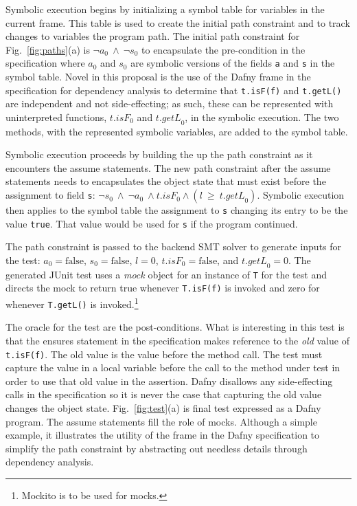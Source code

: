 \documentclass[11pt,onecolumn,notitlepage]{article}
\newcommand{\figref}[1]{Fig.~\ref{#1}}
\begin{document}
Symbolic execution begins by initializing a symbol table for variables in the current frame. This table is used to create the initial path constraint and to track changes to variables the program path. The initial path constraint for \figref{fig:paths}(a) is $\neg a_0\ \wedge\ \neg s_0$ to encapsulate the pre-condition in the specification where $a_0$ and $s_0$ are symbolic versions of the fields \texttt{a} and \texttt{s} in the symbol table. Novel in this proposal is the use of the Dafny frame in the specification for dependency analysis to determine that \texttt{t.isF(f)} and \texttt{t.getL()} are independent and not side-effecting; as such, these can be represented with uninterpreted functions, $\mathit{t.isF}_0$ and $\mathit{t.getL}_0$, in the symbolic execution. The two methods, with the represented symbolic variables, are added to the symbol table.

Symbolic execution proceeds by building the up the path constraint as it encounters the assume statements. The new path constraint after the assume statements needs to encapsulates the object state that must exist before the assignment to field \texttt{s}: $\neg s_0\ \wedge\ \neg a_0\ \wedge \mathit{t.isF}_0 \wedge (l\ \ge\ \mathit{t.getL}_0)$. Symbolic execution then applies to the symbol table the assignment to \texttt{s} changing its entry to be the value \texttt{true}. That value would be used for \texttt{s} if the program continued.

The path constraint is passed to the backend SMT solver to generate inputs for the test: $a_0 = \mathrm{false}$, $s_0 = \mathrm{false}$, $\mathit{l} = 0$, $\mathit{t.isF}_0 = \mathrm{false}$, and $\mathit{t.getL}_0 = 0$. The generated JUnit test uses a \emph{mock} object for an instance of \texttt{T} for the test and directs the mock to return true whenever \texttt{T.isF(f)} is invoked and zero for whenever \texttt{T.getL()} is invoked.\footnote{Mockito is to be used for mocks.} 

The oracle for the test are the post-conditions. What is interesting in this test is that the ensures statement in the specification makes reference to the \emph{old} value of \texttt{t.isF(f)}. The old value is the value before the method call. The test must capture the value in a local variable before the call to the method under test in order to use that old value in the assertion. Dafny disallows any side-effecting calls in the specification so it is never the case that capturing the old value changes the object state. \figref{fig:test}(a) is final test expressed as a Dafny program. The assume statements fill the role of mocks. Although a simple example, it illustrates the utility of the frame in the Dafny specification to simplify the path constraint by abstracting out needless details through dependency analysis.
\end{document}
